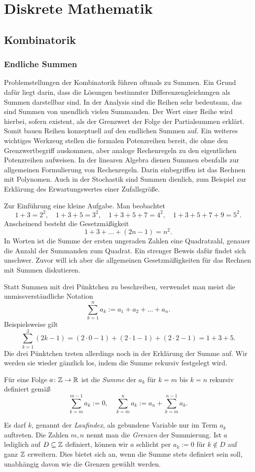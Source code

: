 
\chapter{Diskrete Mathematik}

\section{Kombinatorik}

\subsection{Endliche Summen}

Problemstellungen der Kombinatorik führen oftmals zu Summen.
Ein Grund dafür liegt darin, dass die Lösungen bestimmter
Differenzengleichungen als Summen darstellbar sind. In der Analysis
sind die Reihen sehr bedeutsam, das sind Summen von unendlich vielen
Summanden. Der Wert einer Reihe wird hierbei, sofern existent, als der
Grenzwert der Folge der Partialsummen erklärt.
Somit bauen Reihen konzeptuell auf den endlichen Summen auf.
Ein weiteres wichtiges Werkzeug stellen die formalen Potenzreihen bereit,
die ohne den Grenzwertbegriff auskommen, aber analoge Rechenregeln zu
den eigentlichen Potenzreihen aufweisen. In der linearen Algebra dienen
Summen ebenfalls zur allgemeinen Formulierung von Rechenregeln.
Darin einbegriffen ist das Rechnen mit Polynomen. Auch in der
Stochastik sind Summen dienlich, zum Beispiel zur Erklärung des
Erwartungswertes einer Zufallsgröße.

Zur Einführung eine kleine Aufgabe. Man beobachtet
\[1+3 = 2^2,\quad 1+3+5 = 3^2,\quad 1+3+5+7 = 4^2,\quad 1+3+5+7+9 = 5^2.\]
Anscheinend besteht die Gesetzmäßigkeit
\[1 + 3 + \ldots  + (2n-1) = n^2.\]
In Worten ist die Summe der ersten ungeraden Zahlen eine Quadratzahl,
genauer die Anzahl der Summanden zum Quadrat. Ein strenger Beweis dafür
findet sich unschwer. Zuvor will ich aber die allgemeinen Gesetzmäßigkeiten
für das Rechnen mit Summen diskutieren.

Statt Summen mit drei Pünktchen zu beschreiben, verwendet man meist die
unmissverständliche Notation
\[\textstyle\sum_{k=1}^n a_k := a_1 + a_2 + \ldots + a_n.\]
Beispielsweise gilt
\[\textstyle\sum_{k=1}^3 (2k-1) =
(2\cdot 0-1) + (2\cdot 1 -1 ) + (2\cdot 2 - 1)
= 1 + 3 + 5.\]
Die drei Pünktchen treten allerdings noch in der Erklärung der Summe
auf. Wir werden sie wieder gänzlich los, indem die Summe rekursiv
festgelegt wird.

\begin{Definition}[Summe]\newlinefirst
Für eine Folge $a\colon\mathbb Z\to\mathbb R$ ist die \emph{Summe} der $a_k$ für $k=m$
bis $k=n$ rekursiv definiert gemäß
\[\sum_{k=m}^{m-1} a_k := 0,\quad \sum_{k=m}^n a_k := a_n + \sum_{k=m}^{n-1} a_k.\]
\end{Definition}
Es darf $k$, genannt der \emph{Laufindex}, als gebundene Variable nur
im Term $a_k$ auftreten. Die Zahlen $m,n$ nennt man die \emph{Grenzen}
der Summierung. Ist $a$ lediglich auf $D\subseteq\mathbb Z$ definiert, können
wir $a$ schlicht per $a_k := 0$ für $k\notin D$ auf ganz $\mathbb Z$ erweitern.
Dies bietet sich an, wenn die Summe stets definiert sein soll,
unabhängig davon wie die Grenzen gewählt werden.

